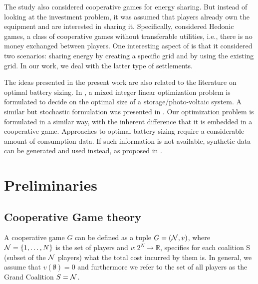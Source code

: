 The study \cite{hedonic} also considered cooperative games for energy sharing. But instead of looking at the investment problem, it was assumed that players already own the equipment and are interested in sharing it. 
Specifically,  \cite{hedonic} considered Hedonic games, a class of cooperative games without transferable utilities, i.e., there is no money exchanged between players. One interesting aspect of \cite{hedonic} is that it considered two scenarios: sharing energy by creating a specific grid and by using the existing grid. In our work, we deal with the latter type of settlements.

The ideas presented in the present work are also related to the literature on optimal battery sizing. In \cite{KHALILPOUR2016194}, a mixed integer linear optimization problem is formulated to decide on the optimal size of a storage/photo-voltaic system. A similar but stochastic formulation was presented in \cite{CERVANTES2018105}. 
Our optimization problem is formulated in a similar way, with the inherent difference that it is embedded in a cooperative game.
Approaches to optimal battery sizing require a considerable amount of consumption data. If such information is not available, synthetic data can be generated and used instead, as proposed in \cite{synthetictraces}.

\section{Preliminaries}

\subsection{Cooperative Game theory}

A cooperative game $G$ can be defined as a tuple $G = (\mathcal{N}, v)$, where $\mathcal{N} = \{1, \dots, N\}$ is the set of players and $v \colon 2^N \to \mathbb{R}$, specifies for each coalition S (subset of the $\mathcal{N}$ players) what the total cost incurred by them is.
In general, we assume that $v(\emptyset) = 0$ and furthermore we refer to the set of all players as the Grand Coalition $S = \mathcal{N}$.

